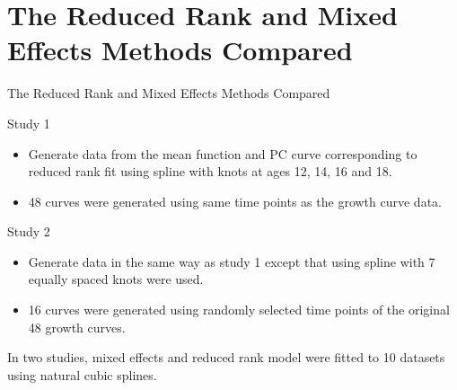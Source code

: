 \documentclass{beamer}
\begin{document}
\section{The Reduced Rank and Mixed Effects Methods Compared}
\begin{frame}{The Reduced Rank and Mixed Effects Methods Compared}
	\begin{block}{Study 1}
		\begin{itemize}
			\item {
				Generate data from the mean function and PC curve corresponding to reduced rank fit using spline with knots at ages 12, 14, 16 and 18.
			}
			\item {
				48 curves were generated using same time points as the growth curve data.
			}
		\end{itemize}
	\end{block}
	\begin{block}{Study 2}
		\begin{itemize}
			\item {
				Generate data in the same way as study 1 except that using spline with 7 equally spaced knots were used.
			}
			\item {
				16 curves were generated using randomly selected time points of the original 48 growth curves.
			}
		\end{itemize}
	\end{block}
	In two studies, mixed effects and reduced rank model were fitted to 10 datasets using natural cubic splines.
\end{frame}
\end{document}
